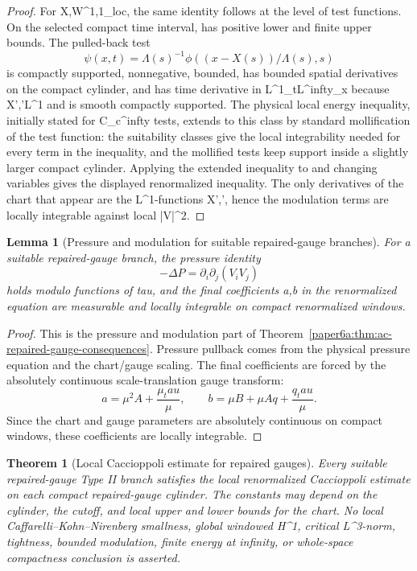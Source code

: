 \documentclass[11pt]{amsart}
\def\({}%
\def\){}%
\def\tau{tau}%
\def\infty{infty}%
\theoremstyle{plain}
\newtheorem{theorem}{Theorem}[section]
\newtheorem{lemma}[lemma]{Lemma}
\theoremstyle{definition}
\theoremstyle{remark}
\begin{document}
\begin{proof}
For \(X,\Lambda\in W^{1,1}_{\rm loc}\), the same identity follows at the level
of test functions.  On the selected compact time interval, \(\Lambda\) has
positive lower and finite upper bounds.  The pulled-back test
\[
  \psi(x,t)=\Lambda(s)^{-1}\phi((x-X(s))/\Lambda(s),s)
\]
is compactly supported, nonnegative, bounded, has bounded spatial derivatives
on the compact cylinder, and has time derivative in \(L^1_tL^\infty_x\)
because \(X',\Lambda'\in L^1\) and \(\phi\) is smooth compactly supported.
The physical local energy inequality, initially stated for \(C_c^\infty\)
tests, extends to this class by standard mollification of the test function:
the suitability classes give the local integrability needed for every term in
the inequality, and the mollified tests keep support inside a slightly larger
compact cylinder.  Applying the extended inequality to \(\psi\) and changing
variables gives the displayed renormalized inequality.  The only derivatives
of the chart that appear are the \(L^1\)-functions \(X',\Lambda'\), hence the
modulation terms are locally integrable against local \(|V|^2\).
\end{proof}

\begin{lemma}[Pressure and modulation for suitable repaired-gauge branches]
\label{paper6a:lem:suitable-gauge-pressure-modulation}
For a suitable repaired-gauge branch, the pressure identity
\[
  -\Delta P=\partial_i\partial_j(V_iV_j)
\]
holds modulo functions of \(\tau\), and the final coefficients \(a,b\) in the
renormalized equation are measurable and locally integrable on compact
renormalized windows.
\end{lemma}

\begin{proof}
This is the pressure and modulation part of
Theorem~\ref{paper6a:thm:ac-repaired-gauge-consequences}.  Pressure pullback
comes from the physical pressure equation and the chart/gauge scaling.  The
final coefficients are forced by the absolutely continuous scale-translation
gauge transform:
\[
  a=\mu^2A+\frac{\mu_\tau}{\mu},
  \qquad
  b=\mu B+\mu Aq+\frac{q_\tau}{\mu}.
\]
Since the chart and gauge parameters are absolutely continuous on compact
windows, these coefficients are locally integrable.
\end{proof}

\begin{theorem}[Local Caccioppoli estimate for repaired gauges]
\label{paper6a:thm:ac-local-caccioppoli}
Every suitable repaired-gauge Type II branch satisfies the local renormalized
Caccioppoli estimate on each compact repaired-gauge cylinder.  The constants
may depend on the cylinder, the cutoff, and local upper and lower bounds for
the chart.  No local Caffarelli--Kohn--Nirenberg smallness, global windowed
\(H^1\), critical \(L^3\)-norm, tightness, bounded modulation, finite energy at
infinity, or whole-space compactness conclusion is asserted.
\end{theorem}
\end{document}
